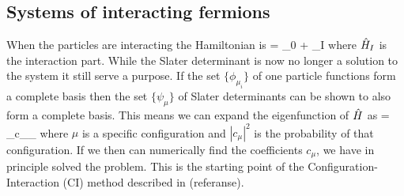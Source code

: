 \subsection{Systems of interacting fermions}
\label{section:InteractingFermions}
When the particles are interacting the Hamiltonian is
\be
\Hop = \Hop_0 + \Hop_I
\ee
where $\hat{H}_I$ is the interaction part. While the Slater determinant is now no longer a solution to the system it still serve a purpose. If the set $\{ \phi_{\mu_i}\}$ of one particle functions form a complete basis then the set $\{\psi_{\mu}\}$ of Slater determinants can be shown to also form a complete basis. This means we can expand the eigenfunction of $\hat{H}$ as
\be
\Psi = \Sum_\mu c_\mu \psi_\mu
\ee
where $\mu$ is a specific configuration and $|c_\mu|^2$ is the probability of that configuration. If we then can numerically find the coefficients $c_\mu$, we have in principle solved the problem. This is the starting point of the Configuration-Interaction (CI) method described in (referanse). 
